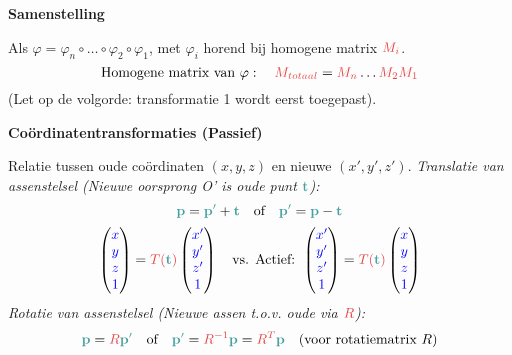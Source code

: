 \documentclass[12pt]{article}
\renewcommand{\vec}[1]{\textcolor{vectorTeal}{\mathbf{#1}}}
\newcommand{\scalar}[1]{\textcolor{scalarBrightBlue}{#1}}
\newcommand{\mat}[1]{\textcolor{matrixSoftRed}{#1}}
\begin{document}
\vspace{1.5em} %
{\centering
\textcolor{headerBrown}{\large\textbf{Samenstelling}}
\par
}%
Als $\varphi = \varphi_n \circ \dots \circ \varphi_2 \circ \varphi_1$, met $\varphi_i$ horend bij homogene matrix $\mat{M_i}$.
\[
\text{Homogene matrix van } \varphi: \quad \mat{M_{totaal}} = \mat{M_n} \dots \mat{M_2} \mat{M_1}
\]
(Let op de volgorde: transformatie 1 wordt eerst toegepast).

\vspace{1.5em} %
{\centering
\textcolor{headerBrown}{\large\textbf{Coördinatentransformaties (Passief)}}
\par
}%
Relatie tussen oude coördinaten $(x,y,z)$ en nieuwe $(x',y',z')$.
\textit{Translatie van assenstelsel (Nieuwe oorsprong O' is oude punt $\vec{t}$):}
\[
\vec{p} = \vec{p'} + \vec{t} \quad \text{of} \quad \vec{p'} = \vec{p} - \vec{t}
\]
\[
\begin{pmatrix} \scalar{x} \\ \scalar{y} \\ \scalar{z} \\ \scalar{1} \end{pmatrix} = \mat{T(\vec{t})} \begin{pmatrix} \scalar{x'} \\ \scalar{y'} \\ \scalar{z'} \\ \scalar{1} \end{pmatrix}
\quad \text{vs. Actief: }
\begin{pmatrix} \scalar{x'} \\ \scalar{y'} \\ \scalar{z'} \\ \scalar{1} \end{pmatrix} = \mat{T(\vec{t})} \begin{pmatrix} \scalar{x} \\ \scalar{y} \\ \scalar{z} \\ \scalar{1} \end{pmatrix}
\]
\textit{Rotatie van assenstelsel (Nieuwe assen t.o.v. oude via $\mat{R}$):}
\[
\vec{p} = \mat{R} \vec{p'} \quad \text{of} \quad \vec{p'} = \mat{R^{-1}} \vec{p} = \mat{R^T} \vec{p} \quad (\text{voor rotatiematrix } R)
\]
\end{document}
